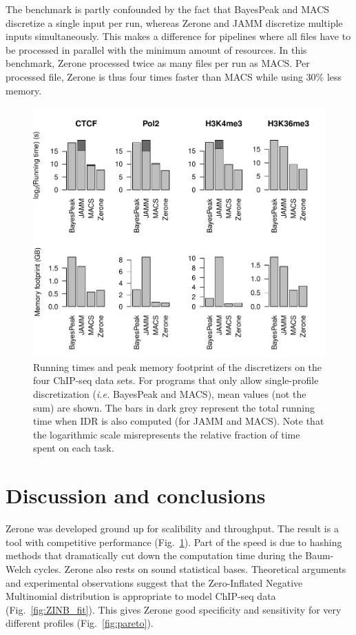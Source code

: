 \documentclass{bioinfo}
\begin{document}
The benchmark is partly confounded by the fact that BayesPeak and MACS
discretize a single input per run, whereas Zerone and JAMM discretize
multiple inputs simultaneously. This makes a difference for pipelines
where all files have to be processed in parallel with the minimum
amount of resources. In this benchmark, Zerone processed twice as
many files per run as MACS. Per processed file, Zerone is thus
four times faster than MACS while using 30\% less memory.

\begin{figure}[!tpb]
\centerline{\includegraphics[scale=0.5]{performance.pdf}}
\caption{
  Running times and peak memory footprint of the
  discretizers on the four ChIP-seq data sets. For programs that only
  allow single-profile discretization (\textit{i.e.} BayesPeak and MACS),
  mean values (not the sum) are shown. The bars in dark grey represent
  the total running time when IDR is also computed (for JAMM and MACS).
  Note that the logarithmic scale misrepresents the relative fraction
  of time spent on each task.
}\label{fig:perf}
\end{figure}

\section{Discussion and conclusions}
Zerone was developed ground up for scalibility and throughput.
The result is a tool with competitive performance (Fig.~\ref{fig:perf}).
Part of the speed is due to hashing methods that dramatically
cut down the computation time during the Baum-Welch cycles. Zerone
also rests on sound statistical bases. Theoretical arguments and
experimental observations suggest that the Zero-Inflated Negative
Multinomial distribution is appropriate to model ChIP-seq data
(Fig.~\ref{fig:ZINB_fit}). This gives Zerone good specificity
and sensitivity for very different profiles (Fig.~\ref{fig:pareto}).
\end{document}
